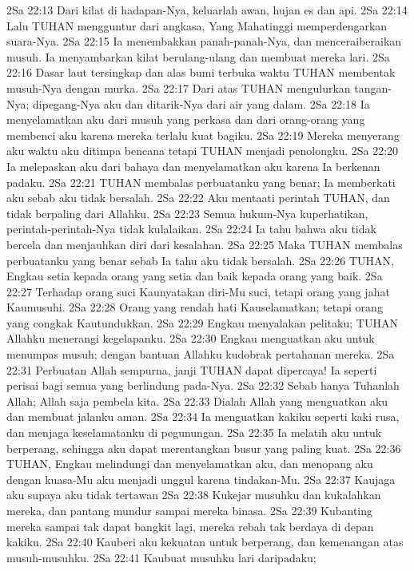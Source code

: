 2Sa 22:13  Dari kilat di hadapan-Nya, keluarlah awan, hujan es dan api.
2Sa 22:14  Lalu TUHAN mengguntur dari angkasa, Yang Mahatinggi memperdengarkan suara-Nya.
2Sa 22:15  Ia menembakkan panah-panah-Nya, dan menceraiberaikan musuh. Ia menyambarkan kilat berulang-ulang dan membuat mereka lari.
2Sa 22:16  Dasar laut tersingkap dan alas bumi terbuka waktu TUHAN membentak musuh-Nya dengan murka.
2Sa 22:17  Dari atas TUHAN mengulurkan tangan-Nya; dipegang-Nya aku dan ditarik-Nya dari air yang dalam.
2Sa 22:18  Ia menyelamatkan aku dari musuh yang perkasa dan dari orang-orang yang membenci aku karena mereka terlalu kuat bagiku.
2Sa 22:19  Mereka menyerang aku waktu aku ditimpa bencana tetapi TUHAN menjadi penolongku.
2Sa 22:20  Ia melepaskan aku dari bahaya dan menyelamatkan aku karena Ia berkenan padaku.
2Sa 22:21  TUHAN membalas perbuatanku yang benar; Ia memberkati aku sebab aku tidak bersalah.
2Sa 22:22  Aku mentaati perintah TUHAN, dan tidak berpaling dari Allahku.
2Sa 22:23  Semua hukum-Nya kuperhatikan, perintah-perintah-Nya tidak kulalaikan.
2Sa 22:24  Ia tahu bahwa aku tidak bercela dan menjauhkan diri dari kesalahan.
2Sa 22:25  Maka TUHAN membalas perbuatanku yang benar sebab Ia tahu aku tidak bersalah.
2Sa 22:26  TUHAN, Engkau setia kepada orang yang setia dan baik kepada orang yang baik.
2Sa 22:27  Terhadap orang suci Kaunyatakan diri-Mu suci, tetapi orang yang jahat Kaumusuhi.
2Sa 22:28  Orang yang rendah hati Kauselamatkan; tetapi orang yang congkak Kautundukkan.
2Sa 22:29  Engkau menyalakan pelitaku; TUHAN Allahku menerangi kegelapanku.
2Sa 22:30  Engkau menguatkan aku untuk menumpas musuh; dengan bantuan Allahku kudobrak pertahanan mereka.
2Sa 22:31  Perbuatan Allah sempurna, janji TUHAN dapat dipercaya! Ia seperti perisai bagi semua yang berlindung pada-Nya.
2Sa 22:32  Sebab hanya Tuhanlah Allah; Allah saja pembela kita.
2Sa 22:33  Dialah Allah yang menguatkan aku dan membuat jalanku aman.
2Sa 22:34  Ia menguatkan kakiku seperti kaki rusa, dan menjaga keselamatanku di pegunungan.
2Sa 22:35  Ia melatih aku untuk berperang, sehingga aku dapat merentangkan busur yang paling kuat.
2Sa 22:36  TUHAN, Engkau melindungi dan menyelamatkan aku, dan menopang aku dengan kuasa-Mu aku menjadi unggul karena tindakan-Mu.
2Sa 22:37  Kaujaga aku supaya aku tidak tertawan
2Sa 22:38  Kukejar musuhku dan kukalahkan mereka, dan pantang mundur sampai mereka binasa.
2Sa 22:39  Kubanting mereka sampai tak dapat bangkit lagi, mereka rebah tak berdaya di depan kakiku.
2Sa 22:40  Kauberi aku kekuatan untuk berperang, dan kemenangan atas musuh-musuhku.
2Sa 22:41  Kaubuat musuhku lari daripadaku;
